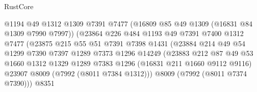 \begin{lexlean}{RustCore}
\begin{coremodule}
                                      @1194
                                      @49
                                      @1312
                                      @1309
                                      @7391
                                      @7477
                                      (@16809 @85 @49 @1309 (@16831 @84 @1309 @7990 @7997))
                                      (@23864
                                        @226
                                        @484
                                        @1193
                                        @49
                                        @7391
                                        @7400
                                        @1312
                                        @7477
                                        (@23875
                                          @215
                                          @55
                                          @51
                                          @7391
                                          @7398
                                          @1431
                                          (@23884
                                            @214
                                            @49
                                            @54
                                            @1299
                                            @7390
                                            @7397
                                            @1289
                                            @7373
                                            @1296
                                            @14249
                                            (@23883
                                              @212
                                              @87
                                              @49
                                              @53
                                              @1660
                                              @1312
                                              @1329
                                              @1289
                                              @7383
                                              @1296
                                              (@16831 @211 @1660 @9112 @9116)
                                              @23907
                                              @8009
                                              (@7992 (@8011 @7384 @1312)))
                                            @8009
                                            (@7992 (@8011 @7374 @7390)))
                                          @8351

\end{coremodule}
\end{lexlean}
